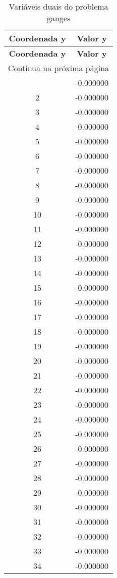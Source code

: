 \documentclass[12pt]{article}
\begin{document}
\begin{longtable}{@{}cc@{}}
\caption{Variáveis duais do problema ganges} \\
\toprule
\textbf{Coordenada y} & \textbf{Valor y} \\
\midrule
\endfirsthead

\toprule
\textbf{Coordenada y} & \textbf{Valor y} \\
\midrule
\endhead

\midrule \multicolumn{2}{r}{{Continua na próxima página}} \\ \midrule
\endfoot

\bottomrule
\endlastfoot
1 & -0.000000 \\
2 & -0.000000 \\
3 & -0.000000 \\
4 & -0.000000 \\
5 & -0.000000 \\
6 & -0.000000 \\
7 & -0.000000 \\
8 & -0.000000 \\
9 & -0.000000 \\
10 & -0.000000 \\
11 & -0.000000 \\
12 & -0.000000 \\
13 & -0.000000 \\
14 & -0.000000 \\
15 & -0.000000 \\
16 & -0.000000 \\
17 & -0.000000 \\
18 & -0.000000 \\
19 & -0.000000 \\
20 & -0.000000 \\
21 & -0.000000 \\
22 & -0.000000 \\
23 & -0.000000 \\
24 & -0.000000 \\
25 & -0.000000 \\
26 & -0.000000 \\
27 & -0.000000 \\
28 & -0.000000 \\
29 & -0.000000 \\
30 & -0.000000 \\
31 & -0.000000 \\
32 & -0.000000 \\
33 & -0.000000 \\
34 & -0.000000 \\

\end{longtable}
\end{document}
